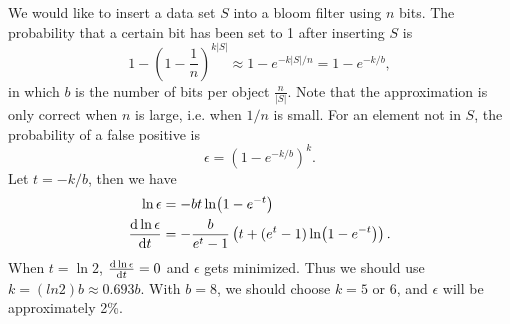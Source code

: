 We would like to insert a data set $S$ into a bloom filter using $n$ bits. The probability that a certain bit has been set to 1 after inserting $S$ is
\begin{equation}\label{bloomfilterheuristic}
1- \left(1-\frac{1}{n}\right)^{k\lvert S\rvert}\approx 1-e^{-k\lvert S\rvert/n}=1-e^{-k/b},
\end{equation}
in which $b$ is the number of bits per object $\frac{n}{\lvert S\rvert}.$ Note that the approximation is only correct when $n$ is large, i.e. when $1/n$ is small. For an element not in $S$, the probability of a false positive is 
\begin{equation*}
\epsilon=\left(1-e^{-k/b}\right)^k.
\end{equation*}
Let $t=-k/b$, then we have
\begin{align*}
\ln\epsilon&=-bt\ln(1-e^{-t})\\
\dv{\ln\epsilon}{t}&=-\frac{b}{e^t-1}\left(t+(e^t-1)\ln(1-e^{-t})\right).\\
\end{align*}
When $t=\ln 2$, $\dv{\ln\epsilon}{t}=0$ and $\epsilon$ gets minimized. Thus we should use $k=(ln 2)b\approx 0.693b.$ With $b=8$, we should choose $k=5$ or 6, and $\epsilon$ will be approximately 2\%. 

\ifx\PREAMBLE\undefined

\fi